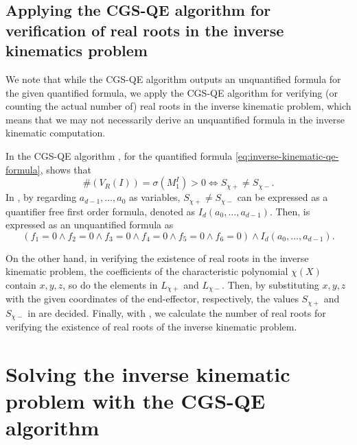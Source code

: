 \documentclass{birkjour}
\theoremstyle{plain}
\theoremstyle{definition}
\newcommand{\Lplus}[1]{L_{{#1}+}}
\newcommand{\Lminus}[1]{L_{{#1}-}}
\newcommand{\Splus}[1]{S_{{#1}+}}
\newcommand{\Sminus}[1]{S_{{#1}-}}
\begin{document}
    \subsection{Applying the CGS-QE algorithm for verification of real roots in the inverse kinematics problem}
    \label{sec:cgs-qe-alg-inverse-kinematics}

    We note that while the CGS-QE algorithm outputs an unquantified formula for the given 
    quantified formula, we apply the CGS-QE algorithm for verifying (or counting 
    the actual number of) real roots in the inverse kinematic problem, which means that 
    we may not necessarily derive an unquantified formula in the inverse kinematic 
    computation. 

    In the CGS-QE algorithm \cite{fuk-iwa-sat2015}, 
    for the quantified formula \eqref{eq:inverse-kinematic-qe-formula}, 
     shows that
    \[
        {\#}(V_{R}(I))=\sigma(M^I_1)>0 \Leftrightarrow \Splus{\chi}\ne \Sminus{\chi}.
    \]
    In , by regarding $a_{d-1},\dots,a_0$ as variables, 
    $\Splus{\chi}\ne\Sminus{\chi}$ can be 
    expressed as a quantifier free first order formula, denoted as $I_d(a_0,\dots,a_{d-1})$.
    Then,  is expressed as an unquantified formula as
    \[
        (f_1=0 \land f_2=0 \land f_3=0 \land f_4=0 \land f_5=0 \land f_6=0) \land
        I_d(a_0,\dots,a_{d-1}).
    \]

    On the other hand, in verifying the existence of real roots in the inverse kinematic problem, 
    the coefficients of the characteristic polynomial $\chi(X)$ contain $x,y,z$,
    so do the elements in $\Lplus{\chi}$ and $\Lminus{\chi}$.
    Then, by substituting $x,y,z$ with the given coordinates of the end-effector, respectively,
    the values $\Splus{\chi}$ and $\Sminus{\chi}$ in  are decided.
    Finally, with , we calculate the number of real roots 
    for verifying the existence of real roots of the inverse kinematic problem.


    \section{Solving the inverse kinematic problem with the CGS-QE algorithm}
    \label{sec:inverse-kinematics-cgsqe}
\end{document}

